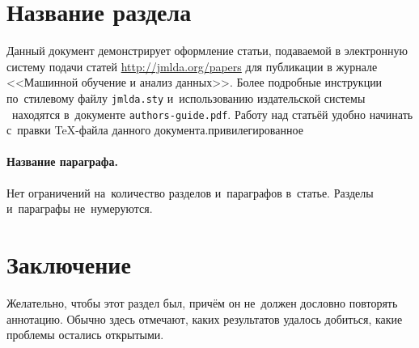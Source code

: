\documentclass[12pt,twoside]{article}
\begin{document}
\section{Название раздела}
Данный документ демонстрирует оформление статьи,
подаваемой в электронную систему подачи статей \url{http://jmlda.org/papers} для публикации в журнале <<Машинной обучение и анализ данных>>.
Более подробные инструкции по~стилевому файлу \texttt{jmlda.sty}
и~использованию издательской системы \LaTeXe\
находятся в~документе \texttt{authors-guide.pdf}.
Работу над статьёй удобно начинать с~правки \TeX-файла данного документа.привилегированное 

\paragraph{Название параграфа.}
Нет ограничений на~количество разделов и~параграфов в~статье.
Разделы и~параграфы не~нумеруются.




\section{Заключение}
Желательно, чтобы этот раздел был, причём он не~должен дословно повторять аннотацию.
Обычно здесь отмечают,
каких результатов удалось добиться,
какие проблемы остались открытыми.



{}


\end{document}
